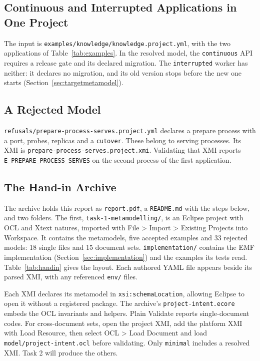 \subsection{Continuous and Interrupted Applications in One Project}
\label{sec:appendix-knowledge}

The input is \texttt{examples/knowledge/knowledge.project.yml}, with the two
applications of Table~\ref{tab:examples}. In the resolved model, the
\texttt{continuous} API requires a release gate and its declared migration. The
\texttt{interrupted} worker has neither: it declares no migration, and its old
version stops before the new one starts
(Section~\ref{sec:targetmetamodel}).

\subsection{A Rejected Model}
\label{sec:appendix-refused}

\texttt{refusals/prepare-process-serves.project.yml} declares a prepare process
with a port, probes, replicas and a \texttt{cutover}. These belong to serving
processes. Its XMI is \texttt{prepare-process-serves.project.xmi}.
Validating that XMI reports \texttt{E\_PREPARE\_PROCESS\_SERVES} on the second
process of the first application.

\subsection{The Hand-in Archive}
\label{sec:handin}

The archive holds this report as \texttt{report.pdf}, a \texttt{README.md}
with the steps below, and two folders. The first, \texttt{task-1-metamodelling/}, is an
Eclipse project with OCL and Xtext natures, imported with File > Import >
Existing Projects into Workspace. It contains the metamodels, five accepted
examples and 33 rejected models: 18 single files and 15 document sets.
\texttt{implementation/} contains the EMF implementation
(Section~\ref{sec:implementation}) and the examples its tests read.
Table~\ref{tab:handin} gives the layout. Each authored YAML file appears beside
its parsed XMI, with any referenced \texttt{env/} files.

Each XMI declares its metamodel in \texttt{xsi:schemaLocation}, allowing Eclipse
to open it without a registered package. The archive's
\texttt{project-intent.ecore} embeds the OCL invariants and helpers. Plain
Validate reports single-document codes. For cross-document sets, open the
project XMI, add the platform XMI with Load Resource, then select OCL > Load
Document and load \texttt{model/project-intent.ocl} before validating. Only
\texttt{minimal} includes a resolved XMI. Task 2 will produce the others.

